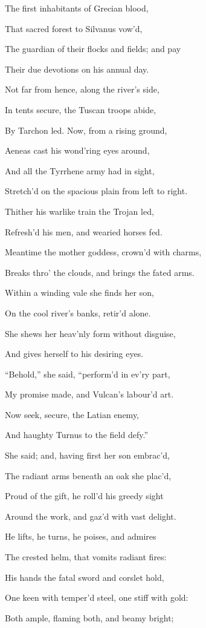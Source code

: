 The first inhabitants of Grecian blood,

That sacred forest to Silvanus vow’d,

The guardian of their flocks and fields; and pay

Their due devotions on his annual day.

Not far from hence, along the river’s side,

In tents secure, the Tuscan troops abide,

By Tarchon led. Now, from a rising ground,

Aeneas cast his wond’ring eyes around,

And all the Tyrrhene army had in sight,

Stretch’d on the spacious plain from left to right.

Thither his warlike train the Trojan led,

Refresh’d his men, and wearied horses fed.

Meantime the mother goddess, crown’d with charms,

Breaks thro’ the clouds, and brings the fated arms.

Within a winding vale she finds her son,

On the cool river’s banks, retir’d alone.

She shews her heav’nly form without disguise,

And gives herself to his desiring eyes.

“Behold,” she said, “perform’d in ev’ry part,

My promise made, and Vulcan’s labour’d art.

Now seek, secure, the Latian enemy,

And haughty Turnus to the field defy.”

She said; and, having first her son embrac’d,

The radiant arms beneath an oak she plac’d,

Proud of the gift, he roll’d his greedy sight

Around the work, and gaz’d with vast delight.

He lifts, he turns, he poises, and admires

The crested helm, that vomits radiant fires:

His hands the fatal sword and corslet hold,

One keen with temper’d steel, one stiff with gold:

Both ample, flaming both, and beamy bright;

